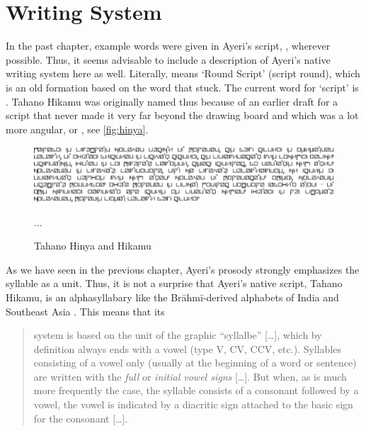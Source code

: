 
\chapter{Writing System}

In the past chapter, example words were given in Ayeri's script, , wherever possible. Thus, it seems advisable to include a 
description of Ayeri's native writing system here as well. Literally, 
 means `Round Script' (script round), which is 
an old formation based on the word  that  stuck. The 
current word for `script' is . Tahano Hikamu was 
originally named thus because of an earlier draft for a script that never made 
it very far beyond the drawing board and which was a lot more angular, or 
, see \autoref{fig:hinya}.

\begin{figure}
\caption{Tahano Hinya and Hikamu}

\begin{minipage}{.5\linewidth}
\includegraphics[width=\linewidth,]{images/hinya-600dpi.png}
\end{minipage}

\begin{minipage}{.5\linewidth}
...
\end{minipage}

\label{fig:hinyahikamu}
\end{figure}

As we have seen in the previous chapter, Ayeri's prosody strongly emphasizes 
the syllable as a unit. Thus, it is not a surprise that Ayeri's native script,
Tahano Hikamu, is an alphasyllabary like the Brāhmī-derived alphabets of India 
and Southeast Asia \parencites{salomon1996}{court1996}. This means that its 
\blockcquote[376]{salomon1996}{system is based on the unit of the graphic 
\enquote{syllalbe} […], which by definition always ends with a vowel (type V, 
CV, CCV, etc.). Syllables consisting of a vowel only (usually at the beginning 
of a word or sentence) are written with the \emph{full} or \emph{initial vowel 
signs} […]. But when, as is much more frequently the case, the syllable consists 
of a consonant followed by a vowel, the vowel is indicated by a diacritic sign 
attached to the basic sign for the consonant […].}

